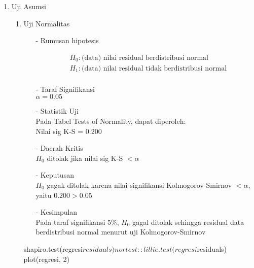 \begin{enumerate}
\def\labelenumi{\arabic{enumi}.}
\tightlist
\item Uji Asumsi

    \begin{enumerate}
    \def\labelenumii{(\alph{enumii})}
    \tightlist
    \item Uji Normalitas \\
    \begin{test}{
        \begin{enumerate}
        \item[-] Rumusan hipotesis \\
        \begin{fleqn}[\parindent]
            \begin{equation*}
            \begin{split}
            &H_0 : \text{(data) nilai residual berdistribusi normal} \\ 
            &H_1 : \text{(data) nilai residual tidak berdistribusi normal} \\
            \end{split}
            \end{equation*}
        \end{fleqn}
    
        \item[-] Taraf Signifikansi \\
        $\alpha = 0.05$
    
        \item[-] Statistik Uji \\
        Pada Tabel Tests of Normality, dapat diperoleh: \\
        Nilai sig K-S = 0.200
    
        \item[-] Daerah Kritis \\
        $H_0$ ditolak jika nilai sig K-S $< \alpha$
    
        \item[-] Keputusan \\
        $H_0$ gagak ditolak karena nilai signifikansi Kolmogorov-Smirnov $< \alpha$, yaitu $0.200 > 0.05$
    
        \item[-] Kesimpulan \\
        Pada taraf signifikansi 5\%, $H_0$ gagal ditolak sehingga residual data berdistribusi normal menurut uji Kolmogorov-Smirnov
    \end{enumerate}
    }
shapiro.test(regresi$residuals)
nortest::lillie.test(regresi$residuals)
plot(regresi, 2)
    \end{test}


\end{enumerate}
\end{enumerate}
